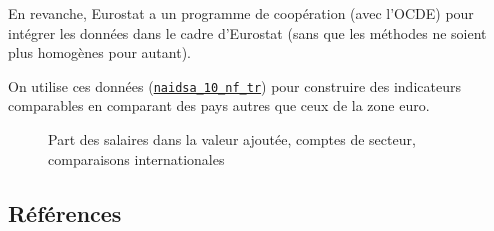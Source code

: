 \documentclass[
  french,
  9pt,
  a4paper,
]{article}
\begin{document}
En revanche, Eurostat a un programme de coopération (avec l'OCDE) pour
intégrer les données dans le cadre d'Eurostat (sans que les méthodes ne
soient plus homogènes pour autant).

On utilise ces données
(\href{https://ec.europa.eu/eurostat/databrowser/view/naidsa_10_nf_tr__custom_13241966/default/table?lang=en}{\texttt{naidsa\_10\_nf\_tr}})
pour construire des indicateurs comparables en comparant des pays autres
que ceux de la zone euro.

\begin{figure}[H]

\caption{\label{fig-tprofithze}Part des salaires dans la valeur ajoutée,
comptes de secteur, comparaisons internationales}


\end{figure}%

\subsection*{Références}\label{ruxe9fuxe9rences}
\end{document}
